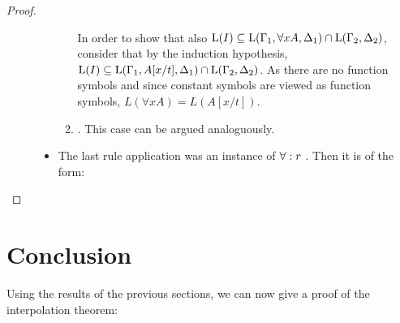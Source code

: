 \begin{proof}
\begin{description}
\begin{itemize}
\begin{enumerate}
							In order to show that also $\operatorname{L}(I) \subseteq \operatorname{L}(\Gamma_1, \forall x A, \Delta_1) \cap \operatorname{L}(\Gamma_2, \Delta_2)$, consider that by the induction hypothesis, 
							$\operatorname{L}(I) \subseteq \operatorname{L}(\Gamma_1, A[x/t], \Delta_1) \cap \operatorname{L}(\Gamma_2, \Delta_2)$.
							As there are no function symbols and since constant symbols are viewed as function symbols, $L(\forall x A) = L(A[x/t])$.


						\item {}.
							This case can be argued analoguously.
					\end{enumerate}
				\item The last rule application was an instance of $\forall:r$ . Then it is of the form:


			\end{itemize}
	\end{description}
\end{proof}




\section{Conclusion}

Using the results of the previous sections, we can now give a proof of the interpolation theorem:

